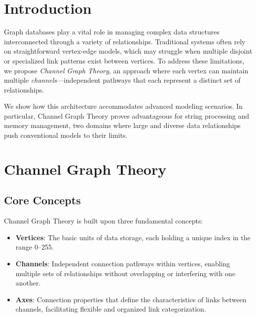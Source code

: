\documentclass[12pt, a4paper]{article}
\begin{document}
\vspace{10pt}
\section{Introduction}\label{Sec:Introduction}
Graph databases play a vital role in managing complex data structures interconnected through a variety of relationships. Traditional systems often rely on straightforward vertex-edge models, which may struggle when multiple disjoint or specialized link patterns exist between vertices. To address these limitations, we propose \emph{Channel Graph Theory}, an approach where each vertex can maintain multiple \emph{channels}—independent pathways that each represent a distinct set of relationships.

We show how this architecture accommodates advanced modeling scenarios. In particular, Channel Graph Theory proves advantageous for string processing and memory management, two domains where large and diverse data relationships push conventional models to their limits.

\section{Channel Graph Theory}\label{Sec:Theory}
\subsection{Core Concepts}
Channel Graph Theory is built upon three fundamental concepts:
\begin{itemize}
    \item \textbf{Vertices}: The basic units of data storage, each holding a unique index in the range 0--255.
    \item \textbf{Channels}: Independent connection pathways within vertices, enabling multiple sets of relationships without overlapping or interfering with one another.
    \item \textbf{Axes}: Connection properties that define the characteristics of links between channels, facilitating flexible and organized link categorization.
\end{itemize}
\end{document}
